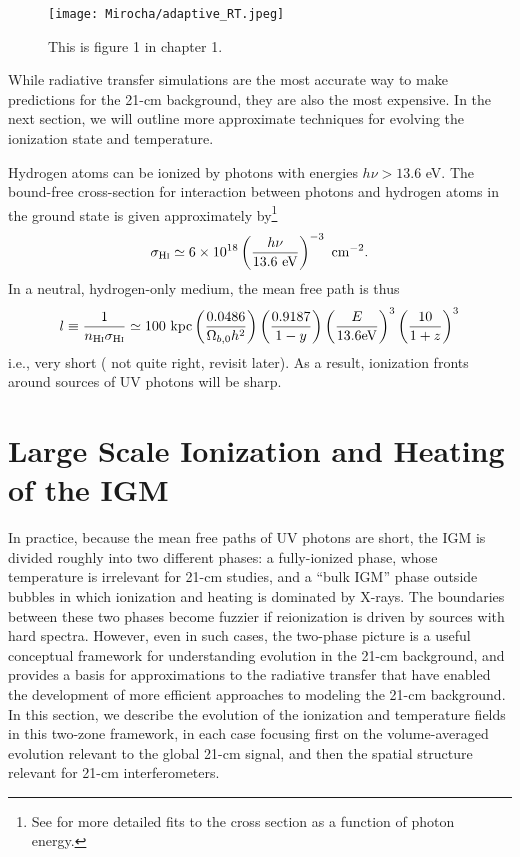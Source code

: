 \begin{figure}[]
\begin{center}
\texttt{[image: Mirocha/adaptive\_RT.jpeg]}
\end{center}
\caption{This is figure 1 in chapter 1.}
\end{figure}


While radiative transfer simulations are the most accurate way to make predictions for the 21-cm background, they are also the most expensive. In the next section, we will outline more approximate techniques for evolving the ionization state and temperature.


Hydrogen atoms can be ionized by photons with energies $h\nu > 13.6$ eV. The bound-free cross-section for interaction between photons and hydrogen atoms in the ground state is given approximately by\footnote{See \cite{Verner1996} for more detailed fits to the cross section as a function of photon energy.}
\begin{equation}
	\sigma_{\text{H} {\textsc{i}}} \simeq 6 \times 10^{18} \left(\frac{h\nu}{13.6 \ \mathrm{eV}} \right)^{-3} \ \mathrm{cm}^{-2} . \label{eq:xsec}
\end{equation}	
In a neutral, hydrogen-only medium, the mean free path is thus
\begin{equation}
	l \equiv \frac{1}{n_{\text{H} {\textsc{i}}} \sigma_{\text{H} {\textsc{i}}}} \simeq 100 \ \mathrm{kpc} \left( \frac{0.0486}{\Omega_{b,0} h^2} \right) \left(\frac{0.9187}{1-y}\right) \left( \frac{E}{13.6 \mathrm{eV}} \right)^3 \left(\frac{10}{1+z} \right)^3 \label{eq:mfp}
\end{equation}
i.e., very short ({\color{red} not quite right, revisit later}). As a result, ionization fronts around sources of UV photons will be sharp. 



\section{Large Scale Ionization and Heating of the IGM} \label{sec:xi_Tk_Ja}
In practice, because the mean free paths of UV photons are short, the IGM is divided roughly into two different phases: a fully-ionized phase, whose temperature is irrelevant for 21-cm studies, and a ``bulk IGM'' phase outside bubbles in which ionization and heating is dominated by X-rays. The boundaries between these two phases become fuzzier if reionization is driven by sources with hard spectra. However, even in such cases, the two-phase picture is a useful conceptual framework for understanding evolution in the 21-cm background, and provides a basis for approximations to the radiative transfer that have enabled the development of more efficient approaches to modeling the 21-cm background. In this section, we describe the evolution of the ionization and temperature fields in this two-zone framework, in each case focusing first on the volume-averaged evolution relevant to the global 21-cm signal, and then the spatial structure relevant for 21-cm interferometers.


